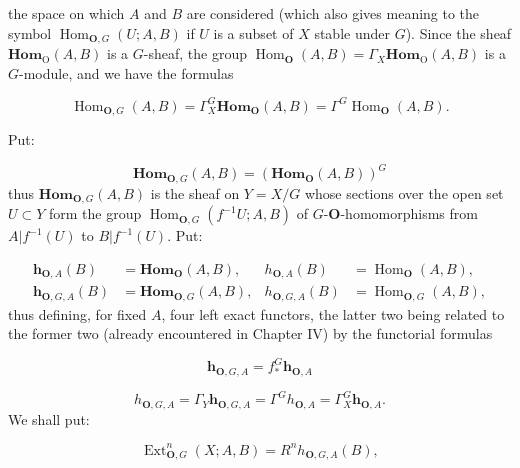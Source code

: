 \clearpage
{}

\noindent the space on which $A$ and $B$ are considered (which also gives
meaning to the symbol $\operatorname{Hom}_{{\mathbf O},G}(U;A,B)$ if $U$ is a subset of
$X$ stable under $G$). Since the sheaf $\mathbf{Hom}_{\mathrm O}(A,B)$ is a
$G$-sheaf, the group
$\operatorname{Hom}_{\mathbf O}(A,B)=\Gamma_X\mathbf{Hom}_{\mathrm O}(A,B)$ is a $G$-module, and
we have the formulas

\[
\tag{5.6.1}
\operatorname{Hom}_{{\mathbf O},G}(A,B)
=\Gamma_X^G\mathbf{Hom}_{\mathbf O}(A,B)
=\Gamma^G\operatorname{Hom}_{\mathbf O}(A,B).
\]

Put:

\[
\tag{5.6.2}
\mathbf{Hom}_{{\mathbf O},G}(A,B)=(\mathbf{Hom}_{\mathbf O}(A,B))^G
\]
 thus $\mathbf{Hom}_{{\mathbf O},G}(A,B)$ is the sheaf on $Y=X/G$ whose
sections over the open set $U\subset Y$ form the group
$\operatorname{Hom}_{{\mathbf O},G}(f^{-1}U;A,B)$ of $G$-${\mathbf O}$-homomorphisms from
$A|f^{-1}(U)$ to $B|f^{-1}(U)$. Put:

\[
\tag{5.6.3}
\begin{aligned}
\mathbf h_{{\mathbf O},A}(B)&=\mathbf{Hom}_{\mathbf O}(A,B),&
h_{{\mathbf O},A}(B)&=\operatorname{Hom}_{\mathbf O}(A,B),\\
\mathbf h_{{\mathbf O},G,A}(B)&=\mathbf{Hom}_{{\mathbf O},G}(A,B),&
h_{{\mathbf O},G,A}(B)&=\operatorname{Hom}_{{\mathbf O},G}(A,B),
\end{aligned}
\]
 thus defining, for fixed $A$, four left exact functors, the latter
two being related to the former two (already encountered in Chapter IV) by
the functorial formulas

\[
\tag{5.6.4}
\mathbf h_{{\mathbf O},G,A}=f_*^G\mathbf h_{{\mathbf O},A}
\]

\[
\tag{5.6.5}
h_{{\mathbf O},G,A}=\Gamma_Y\mathbf h_{{\mathbf O},G,A}
=\Gamma^G h_{{\mathbf O},A}=\Gamma_X^G\mathbf h_{{\mathbf O},A}.
\]
We shall put:

\[
\tag{5.6.6}
\operatorname{Ext}_{{\mathbf O},G}^n(X;A,B)=R^n h_{{\mathbf O},G,A}(B),
\]

